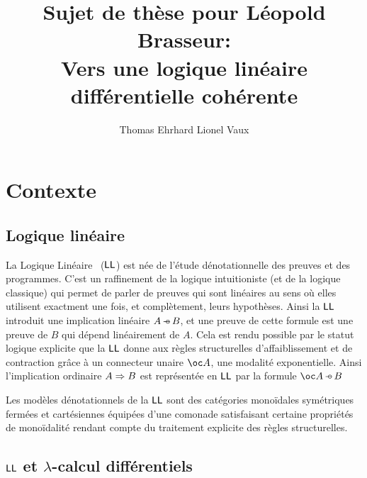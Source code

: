 \documentclass[a4]{article}
\title{Sujet de thèse pour Léopold Brasseur:\\
  Vers une logique linéaire différentielle cohérente}
\author{Thomas Ehrhard \hspace{5em} Lionel Vaux}
\begin{document}
\maketitle

\section*{Contexte}

\subsection*{Logique linéaire}

La Logique Linéaire~\cite{Girard87} ($\hbox{\textsf{LL}}$) est née de l'étude
dénotationnelle des preuves et des programmes.
%
C'est un raffinement de la logique intuitioniste (et de la logique
classique) qui permet de parler de preuves qui sont linéaires au sens
où elles utilisent exactment une fois, et complètement, leurs
hypothèses.
%
Ainsi la $\hbox{\textsf{LL}}$ introduit une implication linéaire ${A}\mathop{-\!\!\!\circ}{B}$, et une
preuve de cette formule est une preuve de $B$ qui dépend linéairement
de $A$.
%
Cela est rendu possible par le statut logique explicite que la $\hbox{\textsf{LL}}$
donne aux règles structurelles d'affaiblissement et de contraction
grâce à un connecteur unaire $\Oc A$, une modalité exponentielle.
%
Ainsi l'implication ordinaire ${A}\Rightarrow{B}$ est représentée en $\hbox{\textsf{LL}}$ par
la formule $\Limpl{\Oc A}B$

Les modèles dénotationnels de la $\hbox{\textsf{LL}}$ sont des catégories monoïdales
symétriques fermées et cartésiennes équipées d'une comonade
satisfaisant certaine propriétés de monoïdalité rendant compte du
traitement explicite des règles structurelles.

\subsection*{$\hbox{\textsf{LL}}$ et $\lambda$-calcul différentiels}
\end{document}
